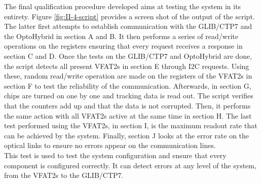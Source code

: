     The final qualification procedure developed aims at testing the system in its entirety. Figure \ref{fig:II-4-script} provides a screen shot of the output of the script. The latter first attempts to establish communication with the GLIB/CTP7 and the OptoHybrid in section A and B. It then performs a series of read/write operations on the registers ensuring that every request receives a response in section C and D. Once the tests on the GLIB/CTP7 and OptoHybrid are done, the script detects all present VFAT2s in section E through I2C requests. Using these, random read/write operation are made on the registers of the VFAT2s in section F to test the reliability of the communication. Afterwards, in section G, chips are turned on one by one and tracking data is read out. The script verifies that the counters add up and that the data is not corrupted. Then, it performs the same action with all VFAT2s active at the same time in section H. The last test performed using the VFAT2s, in section I, is the maximum readout rate that can be achieved by the system. Finally, section J looks at the error rate on the optical links to ensure no errors appear on the communication lines. \\

    This test is used to test the system configuration and ensure that every component is configured correctly. It can detect errors at any level of the system, from the VFAT2s to the GLIB/CTP7.

